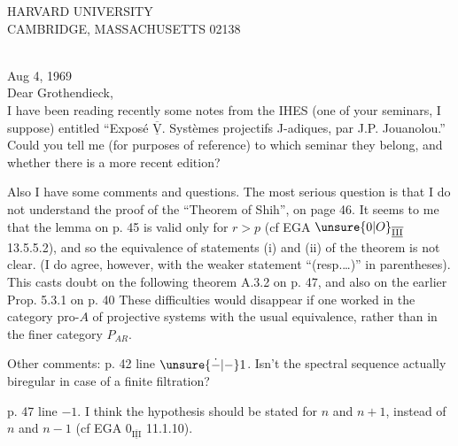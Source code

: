 \begin{center}
{\sffamily HARVARD UNIVERSITY\\
CAMBRIDGE, MASSACHUSETTS 02138}
\end{center}
\\
\hfill Aug 4, 1969\\

\noindent Dear Grothendieck,\\

I have been reading recently some notes from the IHES (one of your seminars, I suppose) entitled ``Exposé \(\overline{\underline{\mathrm{V}}}\). Systèmes
\reversemarginpar\margin{\hfill\rule{0.4pt}{1.6\baselineskip}}\normalmarginpar%
projectifs J-adiques, par J.P. Jouanolou.'' Could you tell me (for purposes of reference) to which seminar they belong, and whether there is a more recent edition?

Also I have some comments and questions. The most serious question is that I do not understand the proof of the ``Theorem of Shih'',  on page 46. It seems to me that the lemma on p. 45 is valid only for \(r>p\) (cf EGA \(\unsure{0|O}_{\overline{\underline{\mathrm{III}}}}\) 13.5.5.2), and so  the equivalence of statements (i) and (ii) of the theorem is not clear. (I do agree, however, with the weaker statement ``(resp.\ldots)'' in parentheses). This casts doubt on the following theorem A.3.2 on p. 47, and also on the earlier Prop. 5.3.1 on p. 40 These difficulties would disappear if one worked  in the category \(\mathrm{pro}\text{-}A\) \margin{\unsure{:}} of projective systems with the usual equivalence, rather than in the  finer category \(P_{AR}\).

Other comments: p. 42 line \(\unsure{\dot{-}|{-}}1\). Isn't the spectral sequence actually biregular in case of a finite filtration?

p. 47 line \(-1\). I think the hypothesis should be stated for \(n\) and \(n+1\), instead of \(n\) and \(n-1\) (cf EGA \(0_{\overline{\underline{\mathrm{III}}}}\) 11.1.10).
\clearpage
